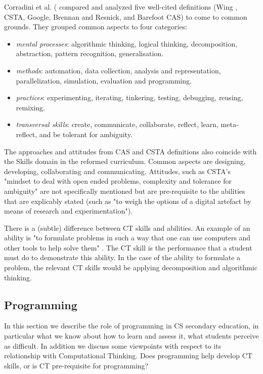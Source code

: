 Corradini et al. (\cite{corradini2017conceptions}
compared and analyzed five well-cited definitions (Wing \cite{Wing2006}, CSTA\cite{CSTA2011CT}, Google\cite{Google2017CT}, Brennan and Resnick\cite{BrennanResnick2012}, and Barefoot CAS\cite{CAS2014CT}) to come to common grounds. They grouped common aspects to four categories:
\begin{itemize}
\item \emph{mental processes}: algorithmic thinking, logical thinking, decomposition, abstraction, pattern recognition, generalisation.
\item \emph{methods}: automation, data collection, analysis and representation, parallelization, simulation, evaluation and programming.
\item \emph{practices}: experimenting, iterating, tinkering, testing, debugging, reusing, remixing.
\item \emph{transversal skills}: create, communicate, collaborate, reflect, learn, meta-reflect, and be tolerant for ambiguity.
\end{itemize}

The approaches and attitudes from CAS and CSTA definitions also coincide with the Skills domain in the reformed curriculum. Common aspects are designing, developing, collaborating and communicating. Attitudes, such as CSTA's "mindset to deal with open ended problems, complexity and tolerance for ambiguity" are not specifically mentioned but are pre-requisite to the abilities that are explicably stated (such as "to weigh the options of a digital artefact by means of research and experimentation").



There is a (subtle) difference between CT skills and abilities. An example of an ability is "to formulate problems in such a way that one can use computers and other tools to help solve them" \cite{Barendsen2016}. The CT skill is the performance that a student must do to demonstrate this ability. In the case of the ability to formulate a problem, the relevant CT skills would be applying decomposition and algorithmic thinking.

\subsection{Programming}
In this section we describe the role of programming in CS secondary education, in particular what we know about how to learn and assess it, what students perceive as difficult. In addition we discuss some viewpoints with respect to its relationship with Computational Thinking. Does programming help develop CT skills, or is CT pre-requisite for programming?

